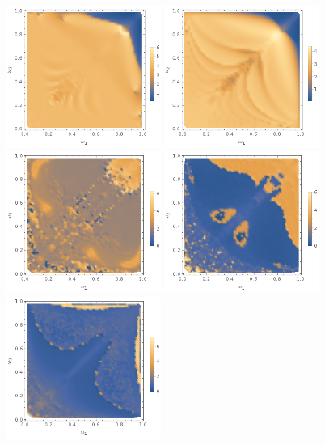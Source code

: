 \documentclass{report}
\begin{document}
\begin{figure}[p]
\begin{adjustwidth}{-1in}{-1in}
    \includegraphics[width=0.45\textwidth]{plot/r_max-phi6-2d.png}
    \includegraphics[width=0.45\textwidth]{plot/r_max-phi6-3d.png} \\
    \includegraphics[width=0.45\textwidth]{plot/slow-mode-logscale-phi6-1d.png}
    \includegraphics[width=0.45\textwidth]{plot/slow-mode-logscale-phi6-2d.png}
    \includegraphics[width=0.45\textwidth]{plot/slow-mode-logscale-phi6-3d.png}

\end{adjustwidth}
\end{figure}
\end{document}
